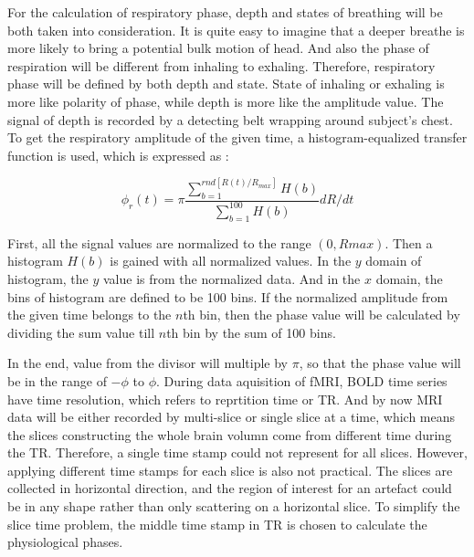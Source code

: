 For the calculation of respiratory phase, depth and states of breathing will be both taken into consideration. 
It is quite easy to imagine that a deeper breathe is more likely to bring a potential bulk motion of head. 
And also the phase of respiration will be different from inhaling to exhaling. 
Therefore, respiratory phase will be defined by both depth and state. 
State of inhaling or exhaling is more like polarity of phase, while depth is more like the amplitude value. 
The signal of depth is recorded by a detecting belt wrapping around subject's chest. 
To get the respiratory amplitude of the given time, a histogram-equalized transfer function is used, which is expressed  as :

\begin{equation}
    \phi_r(t) = \pi \frac{\sum_{b=1}^{rnd[R(t)/R_{max}]}H(b)}{\sum_{b=1}^{100}H(b)}dR/dt
\end{equation}

First, all the signal values are normalized to the range $(0, Rmax)$. Then a histogram $H(b)$ is gained with all normalized values. In the $y$ domain of histogram, the $y$ value is from the normalized data. 
And in the $x$ domain, the bins of histogram are defined to be 100 bins. 
If the normalized amplitude from the given time belongs to the $n$th bin, then the phase value will be calculated by dividing the sum value till $n$th bin by the sum of 100 bins.

In the end, value from the divisor will multiple by $\pi$, so that the phase value will be in the range of $-\phi$ to $\phi$.
During data aquisition of fMRI, BOLD time series have time resolution, which refers to reprtition time or TR. 
And by now MRI data will be either recorded by multi-slice or single slice at a time, which means the slices constructing the whole brain volumn come from different time during the TR. 
Therefore, a single time stamp could not represent for all slices. 
However, applying different time stamps for each slice is also not practical. 
The slices are collected in horizontal direction, and the region of interest for an artefact could be in any shape rather than only scattering on a horizontal slice. 
To simplify the slice time problem, the middle time stamp in TR is chosen to calculate the physiological phases.